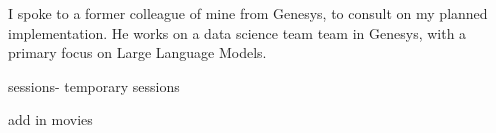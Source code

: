 








I spoke to a former colleague of mine from Genesys, to consult on my planned implementation.
He works on a data science team team in Genesys, with a primary focus on Large Language Models.



sessions-
temporary sessions

add in movies













